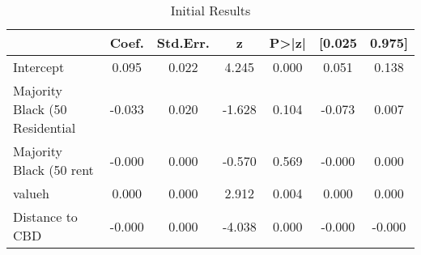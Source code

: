 \begin{table}[h]
\centering
\caption{Initial Results}
\label{tab:initial_results}
\begin{tabular}{lcccccc}
\toprule
 & Coef. & Std.Err. & z & P>|z| & [0.025 & 0.975] \\
\midrule
Intercept & 0.095 & 0.022 & 4.245 & 0.000 & 0.051 & 0.138 \\
Majority Black (50%
Residential & -0.033 & 0.020 & -1.628 & 0.104 & -0.073 & 0.007 \\
Majority Black (50%
rent & -0.000 & 0.000 & -0.570 & 0.569 & -0.000 & 0.000 \\
valueh & 0.000 & 0.000 & 2.912 & 0.004 & 0.000 & 0.000 \\
Distance to CBD & -0.000 & 0.000 & -4.038 & 0.000 & -0.000 & -0.000 \\
\bottomrule
\end{tabular}
\end{table}
